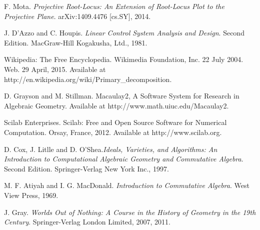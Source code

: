 \documentclass{article}
\begin{document}
\begin{thebibliography}{00} 



 F. Mota. {\em Projective Root-Locus: An Extension of Root-Locus Plot to the Projective Plane}. 
arXiv:1409.4476 [cs.SY], 2014.

 J. D'Azzo and C. Houpis. {\em Linear Control System Analysis and Design}. Second Edition. 
MacGraw-Hill Kogakusha, Ltd., 1981. 

 Wikipedia: The Free Encyclopedia. Wikimedia Foundation, Inc. 22 July 2004. Web. 29 April, 2015. 
Available at http://en.wikipedia.org/wiki/Primary\_decomposition.

 D. Grayson and M. Stillman. Macaulay2, A Software System for Research in Algebraic Geometry. Available at 
http://www.math.uiuc.edu/Macaulay2. 

 Scilab Enterprises. Scilab: Free and Open Source Software for Numerical Computation. Orsay, France, 2012.
Available at http://www.scilab.org. 

 D. Cox, J. Litlle and D. O'Shea.{\em Ideals, Varieties, and Algorithms: An Introduction to 
Computational Algebraic
Geometry and Commutative Algebra}. Second Edition. Springer-Verlag New York Inc., 1997.


 M. F. Atiyah and I. G. MacDonald. {\em Introduction to Commutative Algebra}. West View Press, 1969.

 J. Gray. {\em Worlds Out of Nothing: A Course in the History of Geometry in the 19th Century}.
Springer-Verlag London Limited, 2007, 2011.


\end{thebibliography}
\end{document}
